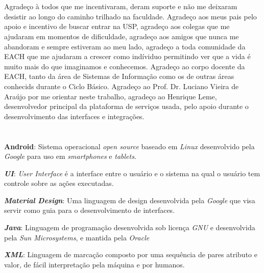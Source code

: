 \documentclass[hidelinks,12pt]{article}
\begin{document}
\section*{}
Agrade\c{c}o \`a todos que me incentivaram, deram suporte e n\~ao me deixaram desistir ao longo do caminho trilhado na faculdade. Agrade\c{c}o aos meus pais pelo apoio e incentivo de buscar entrar na USP, agrade\c{c}o aos colegas que me ajudaram em momentos de dificuldade, agrade\c{c}o aos amigos que nunca me abandoram e sempre estiveram ao meu lado, agrade\c{c}o a toda comunidade da EACH que me ajudaram a crescer como ind\'ividuo permitindo ver que a vida \'e muito mais do que imaginamos e conhecemos. Agrade\c{c}o ao corpo docente da EACH, tanto da \'area de Sistemas de Informa\c{c}\~ao como os de outras \'areas conhecids durante o Ciclo B\'asico. Agrade\c{c}o ao Prof. Dr. Luciano Vieira de Araújo por me orientar neste trabalho, agrade\c{c}o ao Henrique Leme, desenvolvedor principal da plataforma de servi\c{c}os usada, pelo apoio durante o desenvolvimento das interfaces e integra\c{c}\~oes.
\newpage
{}
\section*{}


\hspace{0.5cm}\textbf{Android}: Sistema operacional \textit{open source} baseado em \textit{Linux} desenvolvido pela \textit{Google} para uso em \textit{smartphones} e \textit{tablets}.
\newline

\textbf{\textit{UI}}: \textit{User Interface} é a interface entre o usuário e o sistema na qual o usuário tem controle sobre as ações executadas.
\newline

\textbf{\textit{Material Design}}: Uma linguagem de design desenvolvida pela \textit{Google} que visa servir como guia para o desenvolvimento de interfaces.
\newline

\textbf{\textit{Java}}: Linguagem de programação desenvolvida sob licença \textit{GNU} e desenvolvida pela \textit{Sun Microsystems}, e mantida pela \textit{Oracle}
\newline

\textbf{\textit{XML}}: Linguagem de marcação composto por uma sequência de pares atributo e valor, de fácil interpretação pela máquina e por humanos.
\newpage
{}
\end{document}
